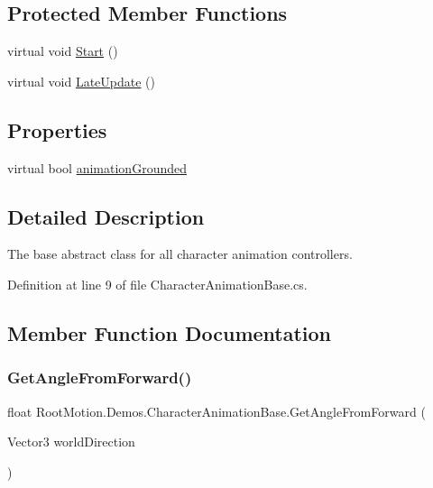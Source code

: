 \subsection*{Protected Member Functions}
\begin{DoxyCompactItemize}
\item 
virtual void \mbox{\hyperlink{class_root_motion_1_1_demos_1_1_character_animation_base_a4ddfae1bf92b14f0f1bb9ddd56ed093d}{Start}} ()
\item 
virtual void \mbox{\hyperlink{class_root_motion_1_1_demos_1_1_character_animation_base_ad0609a7de8cae4fb107f91d0439f32d9}{Late\+Update}} ()
\end{DoxyCompactItemize}
\subsection*{Properties}
\begin{DoxyCompactItemize}
\item 
virtual bool \mbox{\hyperlink{class_root_motion_1_1_demos_1_1_character_animation_base_a5d894598a56e531949eb558fefd2edd2}{animation\+Grounded}}
\end{DoxyCompactItemize}


\subsection{Detailed Description}
The base abstract class for all character animation controllers. 



Definition at line 9 of file Character\+Animation\+Base.\+cs.



\subsection{Member Function Documentation}
\mbox{\label{class_root_motion_1_1_demos_1_1_character_animation_base_af31748e78dec1ece7ed77702f34e9dc9}} 
\subsubsection{\texorpdfstring{Get\+Angle\+From\+Forward()}{GetAngleFromForward()}}
{\footnotesize\ttfamily float Root\+Motion.\+Demos.\+Character\+Animation\+Base.\+Get\+Angle\+From\+Forward (\begin{DoxyParamCaption}\item[{Vector3}]{world\+Direction }\end{DoxyParamCaption})}




